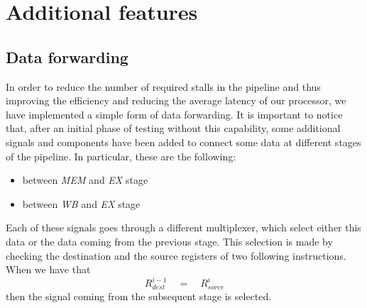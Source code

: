 \chapter{Additional features}
\label{chap_add_feat}



\section{Data forwarding}
In order to reduce the number of required stalls in the pipeline and thus improving the efficiency and reducing the average latency of our processor, we have implemented a simple form of data forwarding.
It is important to notice that, after an initial phase of testing without this capability, some additional signals and components have been added to connect some data at different stages of the pipeline. In particular, these are the following:
\begin{itemize}
	\item between \textit{MEM} and \textit{EX} stage
	\item between \textit{WB} and \textit{EX} stage
\end{itemize}

Each of these signals goes through a different multiplexer, which select either this data or the data coming from the previous stage. This selection is made by checking the destination and the source registers of two following instructions. When we have that
\[R^{i-1}_{dest}\quad = \quad R^{i}_{sorce}\]
then the signal coming from the subsequent stage is selected.


